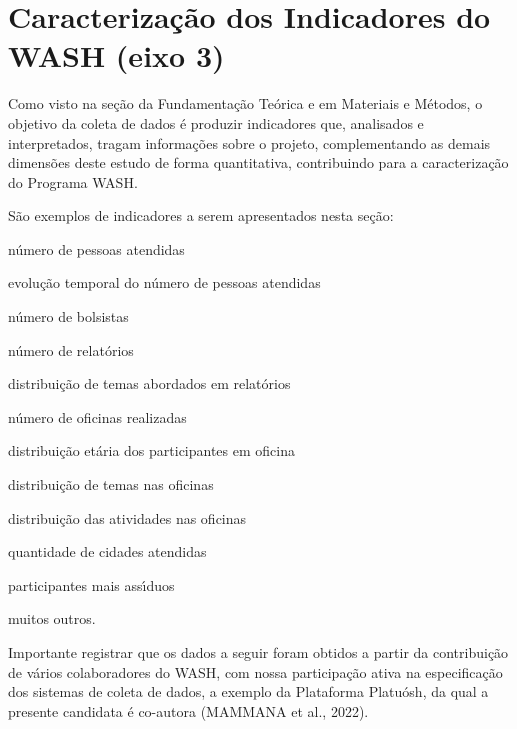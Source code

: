 \documentclass[
12pt,		%
openright,	%
twoside,  %
a4paper,			%
chapter=TITLE,		%
english,			%
french,				%
spanish,			%
brazil				%
]{USPSC-classe/USPSC}
\begin{document}
\section[Caracteriza\c{c}\~ao dos Indicadores do WASH (eixo 3)]{Caracteriza\c{c}\~ao dos Indicadores do WASH (eixo 3)}\label{Caracteriza\c{c}\~ao dos Indicadores do WASH (eixo 3)}
Como visto na se\c{c}\~ao da Fundamenta\c{c}\~ao Te\'orica e em Materiais e M\'etodos, o objetivo da coleta de dados \'e produzir indicadores que, analisados e interpretados, tragam informa\c{c}\~oes sobre o projeto, complementando as demais dimens\~oes deste estudo de forma quantitativa, contribuindo para a caracteriza\c{c}\~ao do Programa WASH.









S\~ao exemplos de indicadores a serem apresentados nesta se\c{c}\~ao:










\begin{alineas}
\item n\'umero de pessoas atendidas
\item evolu\c{c}\~ao temporal do n\'umero de pessoas atendidas
\item n\'umero de bolsistas
\item n\'umero de relat\'orios
\item distribui\c{c}\~ao de temas abordados em relat\'orios
\item n\'umero de oficinas realizadas
\item distribui\c{c}\~ao et\'aria dos participantes em oficina
\item distribui\c{c}\~ao de temas nas oficinas
\item distribui\c{c}\~ao das atividades nas oficinas
\item quantidade de cidades atendidas
\item participantes mais ass\'{\i}duos
\item muitos outros.
\end{alineas}

Importante registrar que os dados a seguir foram obtidos a partir da contribui\c{c}\~ao de v\'arios colaboradores do WASH, com nossa participa\c{c}\~ao ativa na especifica\c{c}\~ao dos sistemas de coleta de dados, a exemplo da Plataforma Platu\'osh, da qual a presente candidata \'e co-autora  (MAMMANA et al., 2022).
\end{document}
